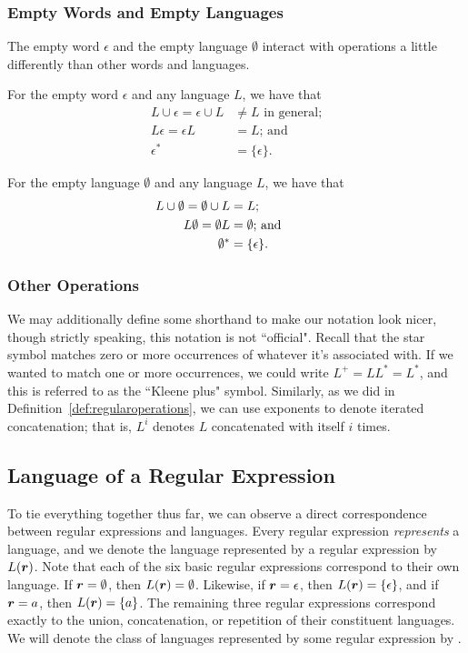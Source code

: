 \subsubsection*{Empty Words and Empty Languages}

The empty word $\epsilon$ and the empty language $\emptyset$ interact with operations a little differently than other words and languages.
\begin{colouredbox}
For the empty word $\epsilon$ and any language $L$, we have that
	\begin{align*}
	L \cup \epsilon = \epsilon \cup L		&\neq L \text{ in general;} \\
	L\epsilon = \epsilon L			&= L \text{; and} \\
	\epsilon^{*}					&= \{\epsilon\}.
	\end{align*}
\end{colouredbox}
\begin{colouredbox}
For the empty language $\emptyset$ and any language $L$, we have that
	\begin{align*}
	L \cup \emptyset = \emptyset \cup L	&= L \text{; \phantom{in general}} \\
	L\emptyset = \emptyset L			&= \emptyset \text{; and} \\
	\emptyset^{*}					&= \{\epsilon\}.
	\end{align*}
\end{colouredbox}

\subsubsection*{Other Operations}

We may additionally define some shorthand to make our notation look nicer, though strictly speaking, this notation is not ``official". Recall that the star symbol matches zero or more occurrences of whatever it's associated with. If we wanted to match one or more occurrences, we could write $L^{+} = LL^{*} = L^{*}$, and this is referred to as the ``Kleene plus" symbol. Similarly, as we did in Definition~\ref{def:regularoperations}, we can use exponents to denote iterated concatenation; that is, $L^{i}$ denotes $L$ concatenated with itself $i$ times.

\subsection{Language of a Regular Expression}

To tie everything together thus far, we can observe a direct correspondence between regular expressions and languages. Every regular expression \emph{represents} a language, and we denote the language represented by a regular expression  by $L(\bm r)$. Note that each of the six basic regular expressions correspond to their own language. If $\bm r = \emptyset$, then $L(\bm r) = \emptyset$. Likewise, if $\bm r = \epsilon$, then $L(\bm r) = \{\epsilon\}$, and if $\bm r = a$, then $L(\bm r) = \{a\}$. The remaining three regular expressions correspond exactly to the union, concatenation, or repetition of their constituent languages. We will denote the class of languages represented by some regular expression by \RE.

